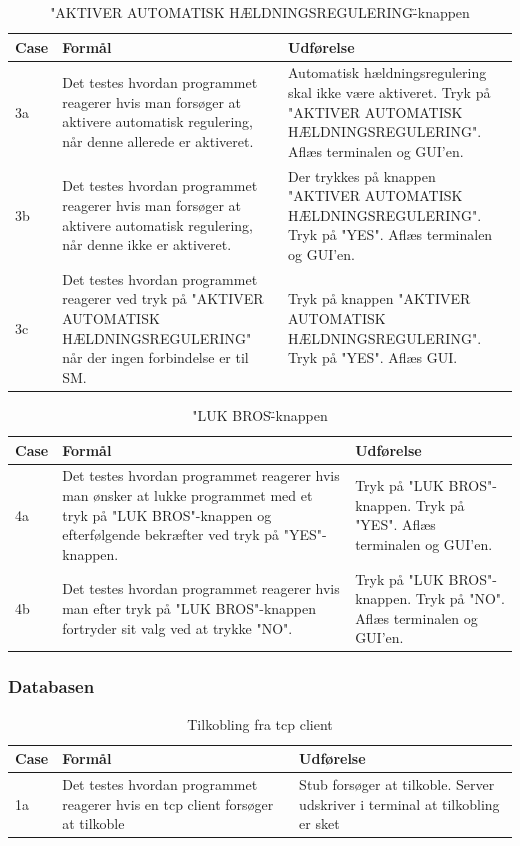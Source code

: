 \begin{table}[H]
\caption{"AKTIVER AUTOMATISK HÆLDNINGSREGULERING\"-knappen}
\centering
\begin{tabular}{| p{1cm}  | p{4.5cm} | p{8cm} |}
\hline
Case &Formål &Udførelse\\\hline
3a &Det testes hvordan programmet reagerer hvis man forsøger at aktivere automatisk regulering, når denne allerede er aktiveret. &Automatisk hældningsregulering skal ikke være aktiveret. Tryk på "AKTIVER AUTOMATISK HÆLDNINGSREGULERING". Aflæs terminalen og GUI'en.\\\hline

3b &Det testes hvordan programmet reagerer hvis man forsøger at aktivere automatisk regulering, når denne ikke er aktiveret. &Der trykkes på knappen "AKTIVER AUTOMATISK HÆLDNINGSREGULERING". Tryk på "YES". Aflæs terminalen og GUI'en.\\\hline

3c &Det testes hvordan programmet reagerer ved tryk på "AKTIVER AUTOMATISK HÆLDNINGSREGULERING" når der ingen forbindelse er til SM.&Tryk på knappen "AKTIVER AUTOMATISK HÆLDNINGSREGULERING". Tryk på "YES". Aflæs GUI.\\\hline
\end{tabular}
\end{table}

\begin{table}[H]
\caption{"LUK BROS\"-knappen}
\centering
\begin{tabular}{| p{1cm}  | p{4.5cm} | p{8cm} |}
\hline
Case &Formål &Udførelse\\\hline
4a &Det testes hvordan programmet reagerer hvis man ønsker at lukke programmet med et tryk på "LUK BROS"-knappen og efterfølgende bekræfter ved tryk på "YES"-knappen.&Tryk på "LUK BROS"-knappen. Tryk på "YES". Aflæs terminalen og GUI'en.\\\hline

4b &Det testes hvordan programmet reagerer hvis man efter tryk på "LUK BROS"-knappen fortryder sit valg ved at trykke "NO".&Tryk på "LUK BROS"-knappen. Tryk på "NO". Aflæs terminalen og GUI'en.\\\hline
\end{tabular}
\end{table}
\subsubsection{Databasen}
\begin{table}[H]
\caption{Tilkobling fra tcp client}
\centering
\begin{tabular}{| p{1cm}  | p{4.5cm} | p{8cm} |}
\hline
Case &Formål &Udførelse\\\hline
1a &Det testes hvordan programmet reagerer hvis en tcp client forsøger at tilkoble &Stub forsøger at tilkoble. Server udskriver i terminal at tilkobling er sket\\\hline
\end{tabular}
\end{table}

